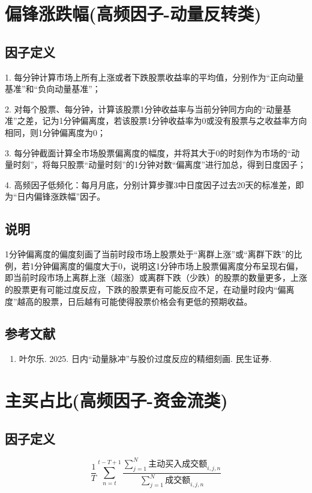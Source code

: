 \documentclass{article}
\begin{document}
\section{偏锋涨跌幅(高频因子-动量反转类)}

\subsection{因子定义}

1. 每分钟计算市场上所有上涨或者下跌股票收益率的平均值，分别作为“正向动量基准”和“负向动量基准”；

2. 对每个股票、每分钟，计算该股票1分钟收益率与当前分钟同方向的“动量基准”之差，记为1分钟偏离度，若该股票1分钟收益率为0或没有股票与之收益率方向相同，则1分钟偏离度为0；

3. 每分钟截面计算全市场股票偏离度的幅度，并将其大于0的时刻作为市场的“动量时刻”，将每只股票“动量时刻”的1分钟对数“偏离度”进行加总，得到日度因子；

4. 高频因子低频化：每月月底，分别计算步骤3中日度因子过去20天的标准差，即为“日内偏锋涨跌幅”因子。

\subsection{说明}
1分钟偏离度的偏度刻画了当前时段市场上股票处于“离群上涨”或“离群下跌”的比例，若1分钟偏离度的偏度大于0，说明这1分钟市场上股票偏离度分布呈现右偏，即当前时段市场上离群上涨（超涨）或离群下跌（少跌）的股票的数量更多，上涨的股票更有可能过度反应，下跌的股票更有可能反应不足，在动量时段内“偏离度”越高的股票，日后越有可能使得股票价格会有更低的预期收益。

\subsection{参考文献}
\begin{enumerate}
    \item 叶尔乐. 2025. 日内“动量脉冲”与股价过度反应的精细刻画. 民生证券.
\end{enumerate}

\section{主买占比(高频因子-资金流类)}

\subsection{因子定义}
\begin{equation}
    \frac{1}{T} \sum_{n=t}^{t-T+1} \frac{\sum_{j=1}^{N} \text{主动买入成交额}_{i,j,n}}{\sum_{j=1}^{N} \text{成交额}_{i,j,n}}
\end{equation}
\end{document}
